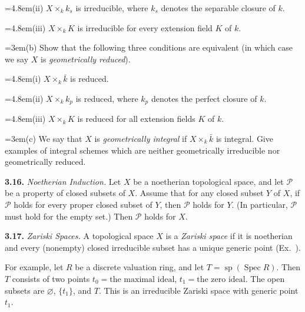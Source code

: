 {\noindent\hangindent=4.8em\hspace*{3em}(ii) $X\times_k k_s$ is irreducible, where $k_s$ denotes the separable closure of $k$.

\noindent\hangindent=4.8em\hspace*{3em}(iii) $X\times_k K$ is irreducible for every extension field $K$ of $k$.

\noindent\hangindent=3em\hspace*{1.7em}(b) Show that the following three conditions are equivalent (in which case we say $X$ is \emph{geometrically reduced}).

\noindent\hangindent=4.8em\hspace*{3em}(i) $X\times_k\bar k$ is reduced.

\noindent\hangindent=4.8em\hspace*{3em}(ii) $X\times_k k_p$ is reduced, where $k_p$ denotes the perfect closure of $k$.

\noindent\hangindent=4.8em\hspace*{3em}(iii) $X\times_k K$ is reduced for all extension fields $K$ of $k$.

\noindent\hangindent=3em\hspace*{1.7em}(c) We say that $X$ is \emph{geometrically integral} if $X\times_k\bar k$ is integral. Give examples of integral schemes which are neither geometrically irreducible nor geometrically reduced.

\smallskip
\noindent\hypertarget{ex-II-3.16}{}\textbf{3.16.} \emph{Noetherian Induction.} Let $X$ be a noetherian topological space, and let $\mathcal P$ be a property of closed subsets of $X$. Assume that for any closed subset $Y$ of $X$, if $\mathcal P$ holds for every proper closed subset of $Y$, then $\mathcal P$ holds for $Y$. (In particular, $\mathcal P$ must hold for the empty set.) Then $\mathcal P$ holds for $X$.

\smallskip
\noindent\hypertarget{ex-II-3.17}{}\textbf{3.17.} \emph{Zariski Spaces.} A topological space $X$ is a \emph{Zariski space} if it is noetherian and every (nonempty) closed irreducible subset has a unique generic point (Ex.~).

For example, let $R$ be a discrete valuation ring, and let $T=\operatorname{sp}(\operatorname{Spec} R)$. Then $T$ consists of two points $t_0=\text{the maximal ideal}$, $t_1=\text{the zero ideal}$. The open subsets are $\varnothing$, $\{t_1\}$, and $T$. This is an irreducible Zariski space with generic point $t_1$.

}
